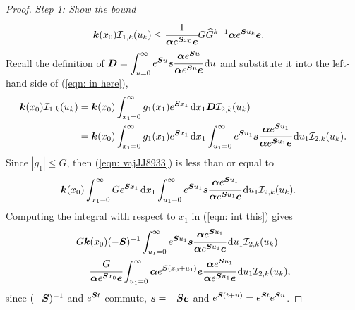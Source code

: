\begin{proof}

	\emph{Step 1: Show the bound}
	\begin{align}
		\boldsymbol k(x_0)\mathcal I_{1,k}(u_k) 
            	&\leq \cfrac{1}{\boldsymbol \alpha e^{\boldsymbol{S}x_0}\boldsymbol e}G\widehat G^{k-1} \boldsymbol \alpha e^{\boldsymbol{S}u_k}\boldsymbol e.\label{eqn: in here}
	\end{align}
	Recall the definition of \(\boldsymbol{D}=\displaystyle\int_{u=0}^\infty e^{\boldsymbol{S}u}\boldsymbol s \cfrac{\boldsymbol \alpha e^{\boldsymbol{S}u}}{\boldsymbol \alpha e^{\boldsymbol{S}u}\boldsymbol e}\, \mathrm{d} u\) and substitute it into the left-hand side of (\ref{eqn: in here}), 
	\begin{align}
		\boldsymbol k(x_0) \mathcal I_{1,k}(u_k) &=\boldsymbol k(x_0) \int_{x_1=0}^\infty g_1(x_1) e^{\boldsymbol{S}x_1} \, \mathrm{d} x_1 \boldsymbol{D} \mathcal I_{2,k}(u_k) \nonumber 
		\\&=\boldsymbol k(x_0)\int_{x_1=0}^\infty g_1(x_1) e^{\boldsymbol{S}x_1} \, \mathrm{d} x_1 \int_{u_1=0}^\infty e^{\boldsymbol{S}u_1}\boldsymbol s \cfrac{\boldsymbol \alpha e^{\boldsymbol{S}u_1}}{\boldsymbol \alpha e^{\boldsymbol{S}u_1}\boldsymbol e}\, \mathrm{d} u_1 \mathcal I_{2,k}(u_k). \label{eqn: vajJJ8933}
	\end{align}
	Since \(|g_1|\leq G\), then (\ref{eqn: vajJJ8933}) is less than or equal to
	\begin{align}
		&\boldsymbol k(x_0) \int_{x_1=0}^\infty G  e^{\boldsymbol{S}x_1} \, \mathrm{d} x_1 \int_{u_1=0}^\infty e^{\boldsymbol{S}u_1}\boldsymbol s \cfrac{\boldsymbol \alpha e^{\boldsymbol{S}u_1}}{\boldsymbol \alpha e^{\boldsymbol{S}u_1}\boldsymbol e}\, \mathrm{d} u_1 \mathcal I_{2,k}(u_k).\label{eqn: int this}
	\end{align}
	Computing the integral with respect to \(x_1\) in (\ref{eqn: int this}) gives 
	\begin{align}
		 &G  \boldsymbol k(x_0)(-\boldsymbol{S})^{-1} \int_{u_1=0}^\infty e^{\boldsymbol{S}u_1}\boldsymbol s \cfrac{\boldsymbol \alpha e^{\boldsymbol{S}u_1}}{\boldsymbol \alpha e^{\boldsymbol{S}u_1}\boldsymbol e}\, \mathrm{d} u_1 \mathcal I_{2,k}(u_k)  \nonumber
		\\&=\cfrac{G}{\boldsymbol \alpha e^{\boldsymbol{S}x_0}\boldsymbol e} \int_{u_1=0}^\infty \boldsymbol \alpha e^{\boldsymbol{S}(x_0+u_1)}\boldsymbol e \cfrac{\boldsymbol \alpha e^{\boldsymbol{S}u_1}}{\boldsymbol \alpha e^{\boldsymbol{S}u_1}\boldsymbol e}\, \mathrm{d} u_1\mathcal I_{2,k}(u_k), \label{eqn: yet another label}
	\end{align}
	since \((-\boldsymbol{S})^{-1}\) and \(e^{\boldsymbol{S}t}\) commute, \(\boldsymbol s = - \boldsymbol{S} \boldsymbol e \) and \(e^{\boldsymbol{S}(t+u)} = e^{\boldsymbol{S}t}e^{\boldsymbol{S}u}\). 

\end{proof}
